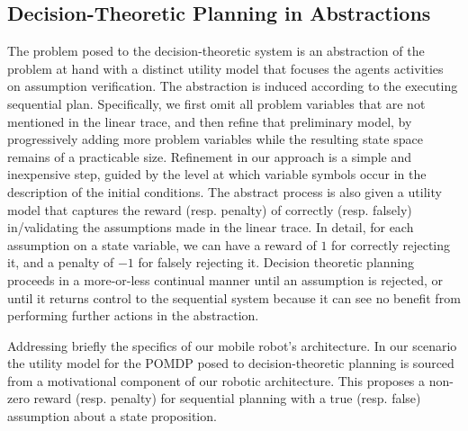 \subsection{Decision-Theoretic Planning in Abstractions}

The problem posed to the decision-theoretic system is an abstraction
of the problem at hand with a distinct utility model that focuses the
agents activities on assumption verification. The abstraction is
induced according to the executing sequential plan. Specifically, we
first omit all problem variables that are not mentioned in the linear
trace, and then refine that preliminary model, by progressively adding
more problem variables while the resulting state space remains of a
practicable size. Refinement in our approach is a simple and
inexpensive step, guided by the level at which variable symbols occur
in the description of the initial conditions. The abstract process is
also given a utility model that captures the reward (resp. penalty) of
correctly (resp. falsely) in/validating the assumptions made in the
linear trace. In detail, for each assumption on a state variable, we
can have a reward of $1$ for correctly rejecting it, and a penalty of
$-1$ for falsely rejecting it. Decision theoretic planning proceeds in
a more-or-less continual manner until an assumption is rejected, or
until it returns control to the sequential system because it can see
no benefit from performing further actions in the abstraction.



Addressing briefly the specifics of our mobile robot's
architecture. In our scenario the utility model for the POMDP posed to
decision-theoretic planning is sourced from a motivational component
of our robotic architecture. This proposes a non-zero reward
(resp. penalty) for sequential planning with a true (resp. false)
assumption about a state proposition.

